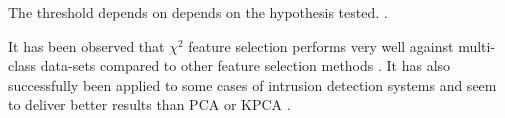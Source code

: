 
The threshold depends on depends on the hypothesis tested. .

It has been observed that $\chi^2$ feature selection performs very well against multi-class data-sets compared to other feature selection methods \cite{Yang:1997:CSF:645526.657137}. It has also successfully been applied to some cases of intrusion detection systems and seem to deliver better results than PCA or KPCA \cite{SumaiyaThaseen2017IntrusionSVM}.

\FloatBarrier
